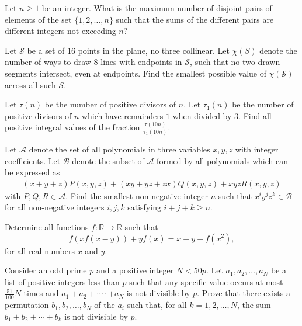 \documentclass[11pt]{scrartcl}
\begin{document}
\begin{problem}[709204825099641]
Let $n \geq 1$ be an integer. What is the maximum number of disjoint pairs of elements of the set $\{ 1,2,\ldots , n \}$ such that the sums of the different pairs are different integers not exceeding $n$?
\end{problem}
\begin{problem}[711016608896725]
Let $\mathcal S$ be a set of $16$ points in the plane, no three collinear. Let $\chi(S)$ denote the number of ways to draw $8$ lines with endpoints in $\mathcal S$, such that no two drawn segments intersect, even at endpoints. Find the smallest possible value of $\chi(\mathcal S)$ across all such $\mathcal S$.
\end{problem}
\begin{problem}[712950951787328]
	Let $\tau(n)$ be the number of positive divisors of $n$. Let $\tau_1(n)$ be the number of positive divisors of $n$ which have remainders $1$ when divided by $3$. Find all positive integral values of the fraction $\frac{\tau(10n)}{\tau_1(10n)}$.
\end{problem}
\begin{problem}[712971117639738]
Let $\mathcal{A}$ denote the set of all polynomials in three variables $x, y, z$ with integer coefficients. Let $\mathcal{B}$ denote the subset of $\mathcal{A}$ formed by all polynomials which can be expressed as
\begin{align*}
(x + y + z)P(x, y, z) + (xy + yz + zx)Q(x, y, z) + xyzR(x, y, z)
\end{align*}with $P, Q, R \in \mathcal{A}$. Find the smallest non-negative integer $n$ such that $x^i y^j z^k \in \mathcal{B}$ for all non-negative integers $i, j, k$ satisfying $i + j + k \geq n$.
\end{problem}
\begin{problem}[716406996122549]
Determine all functions $f: \mathbb{R} \rightarrow \mathbb{R}$ such that$$f(xf(x-y))+yf(x)=x+y+f(x^2),$$for all real numbers $x$ and $y.$
\end{problem}
\begin{problem}[718838419070287]
Consider an odd prime $p$ and a positive integer $N < 50p$. Let $a_1, a_2, \ldots , a_N$ be a list of positive integers less than $p$ such that any specific value occurs at most $\frac{51}{100}N$ times and $a_1 + a_2 + \cdots· + a_N$ is not divisible by $p$. Prove that there exists a permutation $b_1, b_2, \ldots , b_N$ of the $a_i$ such that, for all $k = 1, 2, \ldots , N$, the sum $b_1 + b_2 + \cdots + b_k$ is not divisible by $p$.
\end{problem}
\end{document}
